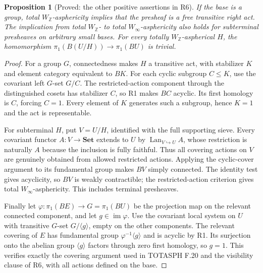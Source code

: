 \documentclass[11pt,a4paper]{article}
\newtheorem{proposition}[theorem]{Proposition}
\theoremstyle{definition}
\theoremstyle{remark}
\newcommand{\Set}{\mathbf{Set}}
\newcommand{\Winfty}{W_\infty}
\newcommand{\WZ}{W_{\mathbb Z}}
\newcommand{\im}{\operatorname{im}}
\newcommand{\Lan}{\operatorname{Lan}}
\begin{document}
\begin{proposition}[Proved: the other positive assertions in R6]\label{A:R6positive}
If the base is a group, total $\WZ$-asphericity implies that the presheaf is a free transitive right act. The implication from total $\WZ$- to total $\Winfty$-asphericity also holds for subterminal presheaves on arbitrary small bases. For every totally $\WZ$-aspherical $H$, the homomorphism $\pi_1(B(U/H))\to\pi_1(BU)$ is trivial.
\end{proposition}
\begin{proof}
For a group $G$, connectedness makes $H$ a transitive act, with stabilizer $K$ and element category equivalent to $BK$. For each cyclic subgroup $C\leq K$, use the covariant left $G$-set $G/C$. The restricted-action component through the distinguished cosets has stabilizer $C$, so R1 makes $BC$ acyclic. Its first homology is $C$, forcing $C=1$. Every element of $K$ generates such a subgroup, hence $K=1$ and the act is representable.

For subterminal $H$, put $V=U/H$, identified with the full supporting sieve. Every covariant functor $A:V\to\Set$ extends to $U$ by $\Lan_{V\hookrightarrow U}A$, whose restriction is naturally $A$ because the inclusion is fully faithful. Thus all covering actions on $V$ are genuinely obtained from allowed restricted actions. Applying the cyclic-cover argument to its fundamental group makes $BV$ simply connected. The identity test gives acyclicity, so $BV$ is weakly contractible; the restricted-action criterion gives total $\Winfty$-asphericity. This includes terminal presheaves.

Finally let $\varphi:\pi_1(BE)\to G=\pi_1(BU)$ be the projection map on the relevant connected component, and let $g\in\im\varphi$. Use the covariant local system on $U$ with transitive $G$-set $G/\langle g\rangle$, empty on the other components. The relevant covering of $E$ has fundamental group $\varphi^{-1}\langle g\rangle$ and is acyclic by R1. Its surjection onto the abelian group $\langle g\rangle$ factors through zero first homology, so $g=1$. This verifies exactly the covering argument used in TOTASPH F.20 and the visibility clause of R6, with all actions defined on the base.
\end{proof}
\end{document}
